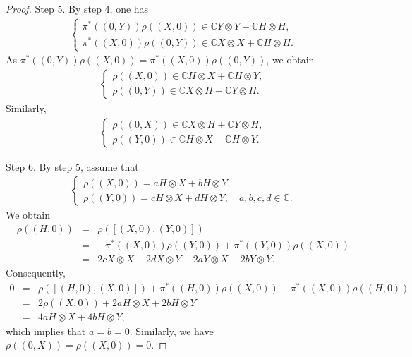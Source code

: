 \documentclass[reqno]{amsart}
\theoremstyle{definition}
\begin{document}
\begin{proof}
Step 5. By step 4, one has
\begin{eqnarray*}
\begin{cases}
\pi^{\ast}((0,Y))\rho((X,0))\in \mathbb{C}Y\otimes Y+\mathbb{C}H\otimes H,\\
\pi^{\ast}((X,0))\rho((0,Y))\in \mathbb{C}X\otimes X+\mathbb{C}H\otimes H.
\end{cases}
\end{eqnarray*}
As $\pi^{\ast}((0,Y))\rho((X,0))=\pi^{\ast}((X,0))\rho((0,Y))$, we obtain
\begin{eqnarray*}
\begin{cases}
\rho((X,0))\in \mathbb{C} H\otimes X+\mathbb{C} H\otimes Y,\\
\rho((0,Y))\in \mathbb{C} X\otimes H+\mathbb{C} Y\otimes H.
\end{cases}
\end{eqnarray*}
Similarly,
\begin{eqnarray*}
\begin{cases}
\rho((0,X))\in \mathbb{C} X\otimes H+\mathbb{C} Y\otimes H,\\
\rho((Y,0))\in \mathbb{C} H\otimes X+\mathbb{C} H\otimes Y.
\end{cases}
\end{eqnarray*}

Step 6. By step 5, assume that
\begin{eqnarray*}
\begin{cases}
\rho((X,0))=a H\otimes X+b H\otimes Y,\\
\rho((Y,0))= c H\otimes X+d H\otimes Y, \quad  a,b,c,d\in \mathbb{C}.
\end{cases}
\end{eqnarray*}
We obtain
\begin{eqnarray*}
\rho((H,0))&=&\rho([(X,0),(Y,0)])\\
           &=&-\pi^{\ast}((X,0))\rho((Y,0))+\pi^{\ast}((Y,0))\rho((X,0))\\
           &=& 2cX\otimes X+2dX\otimes Y-2aY\otimes X-2bY\otimes Y.
\end{eqnarray*}
Consequently,
\begin{eqnarray*}
0 &=& \rho([(H,0),(X,0)])+\pi^{\ast}((H,0))\rho((X,0))-\pi^{\ast}((X,0))\rho((H,0))\\
  &=& 2\rho((X,0))+2aH\otimes X+2bH\otimes Y\\
  &=& 4aH\otimes X+4bH\otimes Y,
\end{eqnarray*}
which implies that $a=b=0$. Similarly, we have $\rho((0,X))=\rho((X,0))=0$.


\end{proof}
\end{document}
